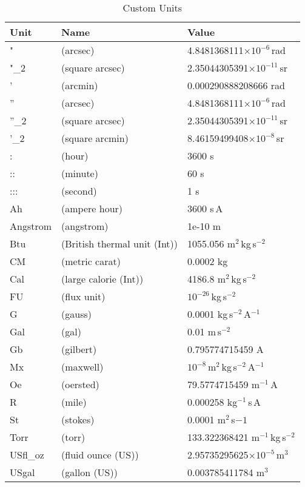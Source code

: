 \begin{table}
\caption{Custom Units \label{table:conv.custom}}

\begin{center}
\begin{tabular}{lll}
Unit & Name & Value \\
\hline
      "          & (arcsec)                      & 4.8481368111$\times10^{-6}$\,rad\\
      "\_2        & (square arcsec)               & 2.35044305391$\times 10^{-11}$\,sr\\
      '          & (arcmin)                      & 0.000290888208666 rad\\
      ''         & (arcsec)                      & 4.8481368111$\times10^{-6}$\,rad\\
      ''\_2       & (square arcsec)               & 2.35044305391$\times10^{-11}$\,sr\\
      '\_2        & (square arcmin)               & 8.46159499408$\times10^{-8}$\,sr\\
      :          & (hour)                        & 3600 s\\
      ::         & (minute)                      & 60 s\\
      :::        & (second)                      & 1 s\\
      Ah         & (ampere hour)                 & 3600 s\,A\\
      Angstrom   & (angstrom)                    & 1e-10 m\\
      Btu        & (British thermal unit (Int))  & 1055.056 m$^{2}$\,kg\,s$^{-2}$\\
      CM         & (metric carat)                & 0.0002 kg\\
      Cal        & (large calorie (Int))         & 4186.8 m$^{2}$\,kg\,s$^{-2}$\\
      FU         & (flux unit)                   & $10^{-26}$\,kg\,s$^{-2}$\\
      G          & (gauss)                       & 0.0001 kg\,s$^{-2}$\,A$^{-1}$\\
      Gal        & (gal)                         & 0.01 m\,s$^{-2}$\\
      Gb         & (gilbert)                     & 0.795774715459 A\\
      Mx         & (maxwell)                     & $10^{-8}$\,m$^{2}$\,kg\,s$^{-2}$\,A$^{-1}$\\
      Oe         & (oersted)                     & 79.5774715459 m$^{-1}$\,A\\
      R          & (mile)                        & 0.000258 kg$^{-1}$\,s\,A\\
      St         & (stokes)                      & 0.0001 m$^{2}$\,s${-1}$\\
      Torr       & (torr)                        & 133.322368421 m$^{-1}$\,kg\,s$^{-2}$\\
      USfl\_oz    & (fluid ounce (US))            & 2.95735295625$\times10^{-5}$\,m$^{3}$\\
      USgal      & (gallon (US))                 & 0.003785411784
      m$^{3}$\\


\end{tabular}
\end{center}
\end{table}

